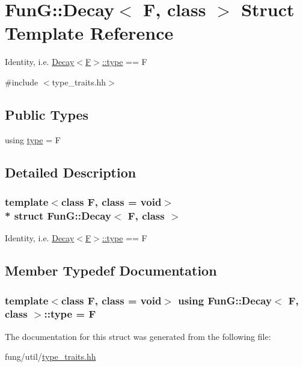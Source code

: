\hypertarget{structFunG_1_1Decay}{}\section{FunG\+:\+:Decay$<$ F, class $>$ Struct Template Reference}
\label{structFunG_1_1Decay}


Identity, i.\+e. \hyperlink{structFunG_1_1Decay_a4b2916cbb7c8587ab3fccc9b896b9df4}{Decay$<$\+F$>$\+::type} == F  




{\ttfamily \#include $<$type\+\_\+traits.\+hh$>$}

\subsection*{Public Types}
\begin{DoxyCompactItemize}
\item 
using \hyperlink{structFunG_1_1Decay_a4b2916cbb7c8587ab3fccc9b896b9df4}{type} = F
\end{DoxyCompactItemize}


\subsection{Detailed Description}
\subsubsection*{template$<$class F, class = void$>$\\*
struct Fun\+G\+::\+Decay$<$ F, class $>$}

Identity, i.\+e. \hyperlink{structFunG_1_1Decay_a4b2916cbb7c8587ab3fccc9b896b9df4}{Decay$<$\+F$>$\+::type} == F 

\subsection{Member Typedef Documentation}
\subsubsection[{\texorpdfstring{type}{type}}]{\setlength{\rightskip}{0pt plus 5cm}template$<$class F, class  = void$>$ using {\bf Fun\+G\+::\+Decay}$<$ F, class $>$\+::{\bf type} =  F}\hypertarget{structFunG_1_1Decay_a4b2916cbb7c8587ab3fccc9b896b9df4}{}\label{structFunG_1_1Decay_a4b2916cbb7c8587ab3fccc9b896b9df4}


The documentation for this struct was generated from the following file\+:\begin{DoxyCompactItemize}
\item 
fung/util/\hyperlink{type__traits_8hh}{type\+\_\+traits.\+hh}\end{DoxyCompactItemize}
